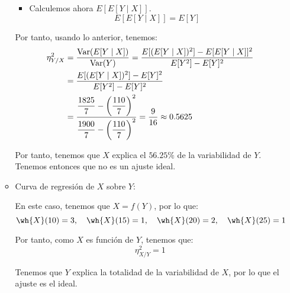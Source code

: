 \begin{ejercicio}
\begin{enumerate}
\begin{itemize}
\begin{itemize}
                \item Calculemos ahora $E[E[Y\mid X]]$.
                \begin{equation*}
                    E[E[Y\mid X]] = E[Y]
                \end{equation*}
            \end{itemize}

            Por tanto, usando lo anterior, tenemos:
            \begin{align*}
                \eta^2_{Y/X} &= \dfrac{\operatorname{Var}(E[Y\mid X])}{\operatorname{Var}(Y)}
                = \dfrac{E[(E[Y\mid X])^2] - E[E[Y\mid X]]^2}{E[Y^2] - E[Y]^2}\\
                &= \dfrac{E[(E[Y\mid X])^2] - E[Y]^2}{E[Y^2] - E[Y]^2}\\
                &= \dfrac{\dfrac{1825}{7} - \left(\dfrac{110}{7}\right)^2}{\dfrac{1900}{7} - \left(\dfrac{110}{7}\right)^2}
                = \dfrac{9}{16} \approx 0.5625
            \end{align*}

            Por tanto, tenemos que $X$ explica el $56.25\%$ de la variabilidad de $Y$. Tenemos entonces que no es un ajuste ideal.

            \item Curva de regresión de $X$ sobre $Y$:
            
            En este caso, tenemos que $X=f(Y)$, por lo que:
            \begin{equation*}
                \wh{X}(10) = 3, \quad \wh{X}(15) = 1, \quad \wh{X}(20) = 2, \quad \wh{X}(25) = 1
            \end{equation*}

            Por tanto, como $X$ es función de $Y$, tenemos que:
            \begin{equation*}
                \eta^2_{X/Y} = 1
            \end{equation*}

            Tenemos que $Y$ explica la totalidad de la variabilidad de $X$, por lo que el ajuste es el ideal.
        \end{itemize}


    \end{enumerate}
\end{ejercicio}

